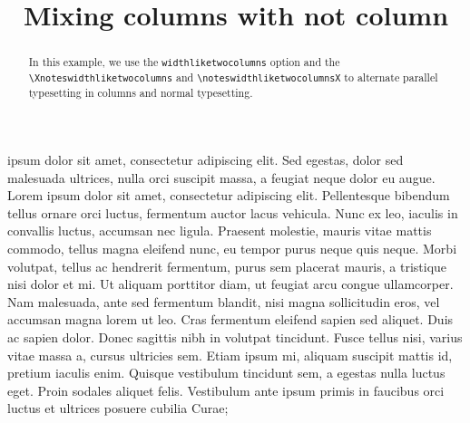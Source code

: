 \documentclass[a4paper]{article}
\begin{document}
\begin{english}
\title{Mixing columns with not column}
\maketitle
\begin{abstract}
In this example, we use the \verb+widthliketwocolumns+ option and the \verb+\Xnoteswidthliketwocolumns+ and \verb+\noteswidthliketwocolumnsX+ to alternate parallel typesetting in columns and normal typesetting.
\end{abstract}
\end{english}

\begin{pairs}\sloppy
\begin{Leftside} 
    \beginnumbering
               \pstart
{} ipsum  dolor sit amet, consectetur adipiscing elit. Sed   egestas, dolor sed malesuada ultrices, nulla orci  suscipit massa, a feugiat neque dolor eu augue.  Lorem ipsum dolor sit amet, consectetur adipiscing  elit. Pellentesque bibendum  tellus ornare orci luctus, fermentum auctor lacus vehicula. Nunc ex leo, iaculis in  convallis  luctus, accumsan nec ligula. Praesent molestie, mauris vitae mattis commodo, tellus magna  eleifend nunc, eu tempor purus neque quis neque. Morbi volutpat, tellus ac hendrerit fermentum, purus sem placerat mauris, a tristique nisi dolor et mi. Ut aliquam porttitor diam, ut  feugiat arcu congue ullamcorper. Nam malesuada, ante sed fermentum blandit, nisi magna sollicitudin eros, vel accumsan magna lorem ut leo. Cras fermentum eleifend sapien sed aliquet. Duis ac sapien dolor. Donec sagittis nibh in volutpat tincidunt. Fusce tellus nisi, varius vitae massa a, cursus ultricies sem. Etiam ipsum mi, aliquam suscipit mattis id, pretium iaculis enim. Quisque vestibulum tincidunt sem, a egestas nulla  luctus eget. Proin sodales aliquet felis.  Vestibulum ante ipsum primis in faucibus orci luctus et  ultrices posuere cubilia Curae;


\end{Leftside}
\end{pairs}
\end{document}
